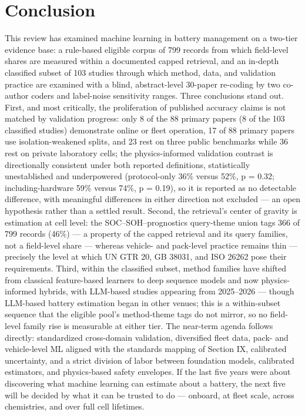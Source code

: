 \documentclass[journal]{IEEEtran}
\begin{document}
\section{Conclusion}

This review has examined machine learning in battery management on a two-tier evidence base: a rule-based eligible corpus of 799 records from which field-level shares are measured within a documented capped retrieval, and an in-depth classified subset of 103 studies through which method, data, and validation practice are examined with a blind, abstract-level 30-paper re-coding by two co-author coders and label-noise sensitivity ranges. Three conclusions stand out. First, and most critically, the proliferation of published accuracy claims is not matched by validation progress: only 8 of the 88 primary papers (8 of the 103 classified studies) demonstrate online or fleet operation, 17 of 88 primary papers use isolation-weakened splits, and 23 rest on three public benchmarks while 36 rest on private laboratory cells; the physics-informed validation contrast is directionally consistent under both reported definitions, statistically unestablished and underpowered (protocol-only 36\% versus 52\%, p = 0.32; including-hardware 59\% versus 74\%, p = 0.19), so it is reported as no detectable difference, with meaningful differences in either direction not excluded --- an open hypothesis rather than a settled result. Second, the retrieval's center of gravity is estimation at cell level: the SOC--SOH--prognostics query-theme union tags 366 of 799 records (46\%) --- a property of the capped retrieval and its query families, not a field-level share --- whereas vehicle- and pack-level practice remains thin --- precisely the level at which UN GTR 20, GB 38031, and ISO 26262 pose their requirements. Third, within the classified subset, method families have shifted from classical feature-based learners to deep sequence models and now physics-informed hybrids, with LLM-based studies appearing from 2025--2026 --- though LLM-based battery estimation began in other venues; this is a within-subset sequence that the eligible pool's method-theme tags do not mirror, so no field-level family rise is measurable at either tier. The near-term agenda follows directly: standardized cross-domain validation, diversified fleet data, pack- and vehicle-level ML aligned with the standards mapping of Section IX, calibrated uncertainty, and a strict division of labor between foundation models, calibrated estimators, and physics-based safety envelopes. If the last five years were about discovering what machine learning can estimate about a battery, the next five will be decided by what it can be trusted to do --- onboard, at fleet scale, across chemistries, and over full cell lifetimes.
\end{document}
